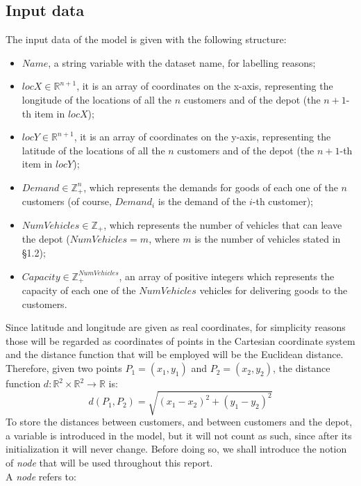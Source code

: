 \documentclass[../main.tex]{subfiles}
\begin{document}
\subsection{Input data}
The input data of the model is given with the following structure:
\begin{itemize}
    \item $Name$, a string variable with the dataset name, for labelling reasons;
    \item $locX \in \mathbb{R}^{n+1}$, it is an array of coordinates on the x-axis, representing the longitude of the locations of all the $n$ customers and of the depot (the $n+1$-th item in $locX$);
    \item $locY \in \mathbb{R}^{n+1}$, it is an array of coordinates on the y-axis, representing the latitude of the locations of all the $n$ customers and of the depot (the $n+1$-th item in $locY$);
    \item $Demand \in \mathbb{Z}_+^n$, which represents the demands for goods of each one of the $n$ customers (of course, $Demand_i$ is the demand of the $i$-th customer);
    \item $NumVehicles \in \mathbb{Z}_+$, which represents the number of vehicles that can leave the depot ($NumVehicles = m$, where $m$ is the number of vehicles stated in §1.2);
    \item $Capacity \in \mathbb{Z}_+^{NumVehicles}$, an array of positive integers which represents the capacity of each one of the $NumVehicles$ vehicles for delivering goods to the customers.
\end{itemize}
\noindent
Since latitude and longitude are given as real coordinates, for simplicity reasons those will be regarded as coordinates of points in the Cartesian coordinate system and the distance function that will be employed will be the Euclidean distance.\\
Therefore, given two points $P_1 = (x_1, y_1)$ and $P_2 = (x_2, y_2)$, the distance function $d: \mathbb{R}^2 \times \mathbb{R}^2 \rightarrow \mathbb{R}$ is: $$d(P_1, P_2) = \sqrt{(x_1 - x_2)^2+(y_1 - y_2)^2}$$
To store the distances between customers, and between customers and the depot, a variable is introduced in the model, but it will not count as such, since after its initialization it will never change.
Before doing so, we shall introduce the notion of \textit{node} that will be used throughout this report.\\
A \textit{node} refers to:
\end{document}
